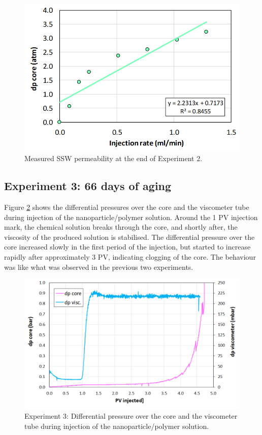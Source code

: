 \begin{figure}[h!]
    \centering
    \includegraphics[width=\textwidth]{img/cht/gelexp2_4.png}
    \caption{Measured SSW permeability at the end of Experiment 2.}
    \label{cht:gelexp2_4} %
\end{figure}

\FloatBarrier
\subsection{Experiment 3: 66 days of aging}

Figure \ref{cht:gelexp3_1} shows the differential pressures over the core and the viscometer tube during injection of the nanoparticle/polymer solution. Around the 1 PV injection mark, the chemical solution breaks through the core, and shortly after, the viscosity of the produced solution is stabilised. The differential pressure over the core increased slowly in the first period of the injection, but started to increase rapidly after approximately 3 PV, indicating clogging of the core. The behaviour was like what was observed in the previous two experiments.



\begin{figure}[h!]
    \centering
    \includegraphics[width=\textwidth]{img/cht/gelexp3_1.png}
    \caption{Experiment 3: Differential pressure over the core and the viscometer tube during injection of the nanoparticle/polymer solution.}
    \label{cht:gelexp3_1} %
\end{figure}

